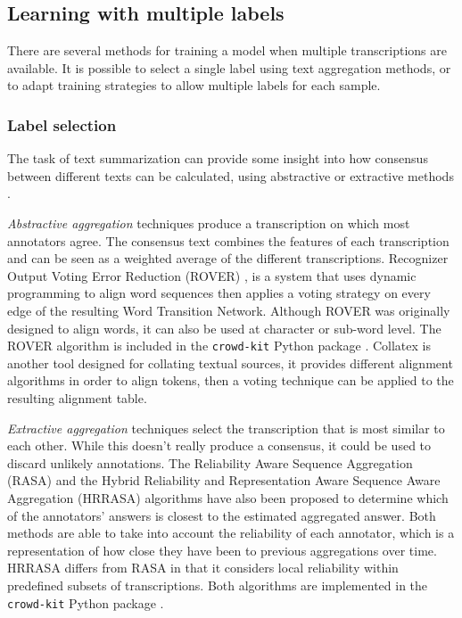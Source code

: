 \documentclass[sigconf]{acmart}
\begin{document}
\subsection{Learning with multiple labels}
There are several methods for training a model when multiple transcriptions are available. It is possible to select a single label using text aggregation methods, or to adapt training strategies to allow multiple labels for each sample.


\subsubsection{Label selection}


The task of text summarization can provide some insight into how consensus between different texts can be calculated, using abstractive or extractive methods \cite{ElKassas2021}. 

\textit{Abstractive aggregation}  techniques produce a transcription on which most annotators agree. The consensus text combines the features of each transcription and can be seen as a weighted average of the different transcriptions. Recognizer Output Voting Error Reduction (ROVER) \cite{Fiscus1997}, is a system that uses dynamic programming to align word sequences then applies a voting strategy on every edge of the resulting Word Transition Network. Although ROVER was originally designed to align words, it can also be used at character or sub-word level. The ROVER algorithm is included in the \texttt{crowd-kit} Python package \cite{CrowdKit}. 
Collatex \cite{Collatex} is another tool designed for collating textual sources, it provides different alignment algorithms in order to align tokens, then a voting technique can be applied to the resulting alignment table.

\textit{Extractive aggregation}  techniques select the transcription that is most similar to each other. While this doesn't really produce a consensus, it could be used to discard unlikely annotations. The Reliability Aware Sequence Aggregation (RASA) \cite{Li2019} and the Hybrid Reliability and Representation Aware Sequence Aware Aggregation (HRRASA) \cite{Li2020} algorithms have also been proposed to determine which of the annotators' answers is closest to the estimated aggregated answer. Both methods are able to take into account the reliability of each annotator, which is a representation of how close they have been to previous aggregations over time.
HRRASA differs from RASA in that it considers local reliability within predefined subsets of transcriptions. Both algorithms are implemented in the \texttt{crowd-kit} Python package \cite{CrowdKit}.
\end{document}
